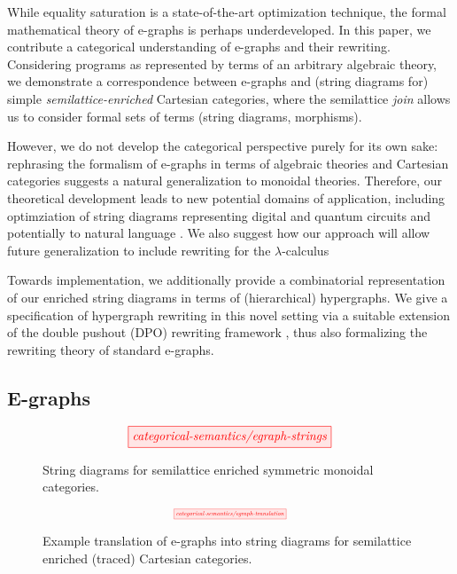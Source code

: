 While equality saturation is a state-of-the-art optimization technique, the formal mathematical theory of e-graphs is perhaps underdeveloped. In this paper, we contribute a categorical understanding of e-graphs and their rewriting. Considering programs as represented by terms of an arbitrary algebraic theory, we demonstrate a correspondence between e-graphs and (string diagrams for) simple \textit{semilattice-enriched} Cartesian categories, where the semilattice \textit{join} allows us to consider formal sets of terms (string diagrams, morphisms). 

However, we do not develop the categorical perspective purely for its own sake: rephrasing the formalism of e-graphs in terms of algebraic theories and Cartesian categories suggests a natural generalization to monoidal theories. Therefore, our theoretical development leads to new potential domains of application, including optimziation of string diagrams representing digital \cite{ghica_compositional_2023} and quantum circuits
\cite{coecke_interacting_2011,ZX} and potentially to natural language \cite{wazni_quantum_2022,coecke_lambek_2013}.  We also suggest how our approach will allow future  generalization to include rewriting for the $\lambda$-calculus 
\cite{koehler2022sketchguided} %

Towards implementation, we 
additionally provide a combinatorial representation of our enriched string diagrams in terms of (hierarchical)  hypergraphs.  We give a specification of hypergraph rewriting in this novel setting via a suitable extension of the double pushout (DPO) rewriting framework 
\cite{bonchi_string_2022-1,bonchi_string_2022-2,bonchi_string_2022},  thus also formalizing the rewriting theory of standard e-graphs. 

\subsection*{E-graphs}

\begin{figure}\label{fig:egraph-strings}
\[
    \tikzfig{categorical-semantics/egraph-strings}
\]
\caption{String diagrams for semilattice enriched symmetric monoidal categories.}
\end{figure}

\begin{figure}\label{fig:e-graph-example}
\[
    \scalebox{0.5}{
    \tikzfig{categorical-semantics/egraph-translation}
    }
\]
\caption{Example translation of e-graphs into string diagrams for semilattice enriched (traced) Cartesian categories.}
\end{figure}

